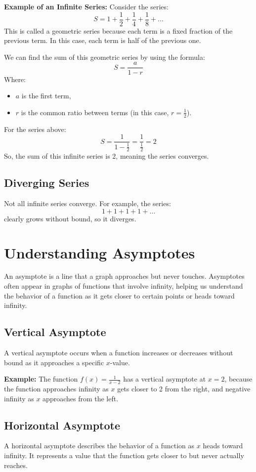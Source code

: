 \textbf{Example of an Infinite Series:}
Consider the series:
\[
S = 1 + \frac{1}{2} + \frac{1}{4} + \frac{1}{8} + \dots
\]
This is called a geometric series because each term is a fixed fraction of the previous term. In this case, each term is half of the previous one.

We can find the sum of this geometric series by using the formula:
\[
S = \frac{a}{1 - r}
\]
Where:
\begin{itemize}
    \item $a$ is the first term,
    \item $r$ is the common ratio between terms (in this case, $r = \frac{1}{2}$).
\end{itemize}

For the series above:
\[
S = \frac{1}{1 - \frac{1}{2}} = \frac{1}{\frac{1}{2}} = 2
\]
So, the sum of this infinite series is 2, meaning the series converges.

\subsection{Diverging Series}
Not all infinite series converge. For example, the series:
\[
1 + 1 + 1 + 1 + \dots
\]
clearly grows without bound, so it diverges.

\section{Understanding Asymptotes}
An asymptote is a line that a graph approaches but never touches. Asymptotes often appear in graphs of functions that involve infinity, helping us understand the behavior of a function as it gets closer to certain points or heads toward infinity.

\subsection{Vertical Asymptote}
A vertical asymptote occurs when a function increases or decreases without bound as it approaches a specific $x$-value.

\textbf{Example:} The function $f(x) = \frac{1}{x-2}$ has a vertical asymptote at $x = 2$, because the function approaches infinity as $x$ gets closer to 2 from the right, and negative infinity as $x$ approaches from the left.

\subsection{Horizontal Asymptote}
A horizontal asymptote describes the behavior of a function as $x$ heads toward infinity. It represents a value that the function gets closer to but never actually reaches.

